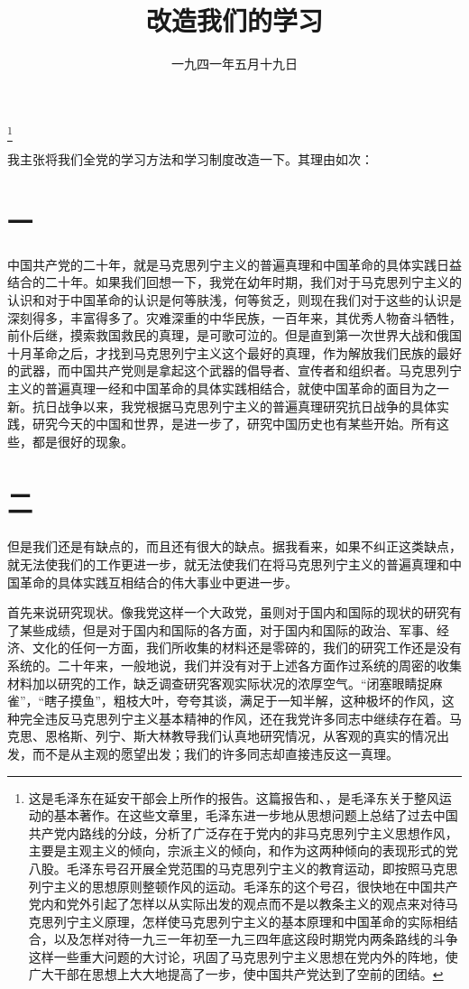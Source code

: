 
\title{改造我们的学习}
\date{一九四一年五月十九日}
\thanks{这是毛泽东在延安干部会上所作的报告。这篇报告和、，是毛泽东关于整风运动的基本著作。在这些文章里，毛泽东进一步地从思想问题上总结了过去中国共产党内路线的分歧，分析了广泛存在于党内的非马克思列宁主义思想作风，主要是主观主义的倾向，宗派主义的倾向，和作为这两种倾向的表现形式的党八股。毛泽东号召开展全党范围的马克思列宁主义的教育运动，即按照马克思列宁主义的思想原则整顿作风的运动。毛泽东的这个号召，很快地在中国共产党内和党外引起了怎样以从实际出发的观点而不是以教条主义的观点来对待马克思列宁主义原理，怎样使马克思列宁主义的基本原理和中国革命的实际相结合，以及怎样对待一九三一年初至一九三四年底这段时期党内两条路线的斗争这样一些重大问题的大讨论，巩固了马克思列宁主义思想在党内外的阵地，使广大干部在思想上大大地提高了一步，使中国共产党达到了空前的团结。}
\maketitle


我主张将我们全党的学习方法和学习制度改造一下。其理由如次：

\section*{一}

中国共产党的二十年，就是马克思列宁主义的普遍真理和中国革命的具体实践日益结合的二十年。如果我们回想一下，我党在幼年时期，我们对于马克思列宁主义的认识和对于中国革命的认识是何等肤浅，何等贫乏，则现在我们对于这些的认识是深刻得多，丰富得多了。灾难深重的中华民族，一百年来，其优秀人物奋斗牺牲，前仆后继，摸索救国救民的真理，是可歌可泣的。但是直到第一次世界大战和俄国十月革命之后，才找到马克思列宁主义这个最好的真理，作为解放我们民族的最好的武器，而中国共产党则是拿起这个武器的倡导者、宣传者和组织者。马克思列宁主义的普遍真理一经和中国革命的具体实践相结合，就使中国革命的面目为之一新。抗日战争以来，我党根据马克思列宁主义的普遍真理研究抗日战争的具体实践，研究今天的中国和世界，是进一步了，研究中国历史也有某些开始。所有这些，都是很好的现象。

\section*{二}

但是我们还是有缺点的，而且还有很大的缺点。据我看来，如果不纠正这类缺点，就无法使我们的工作更进一步，就无法使我们在将马克思列宁主义的普遍真理和中国革命的具体实践互相结合的伟大事业中更进一步。

首先来说研究现状。像我党这样一个大政党，虽则对于国内和国际的现状的研究有了某些成绩，但是对于国内和国际的各方面，对于国内和国际的政治、军事、经济、文化的任何一方面，我们所收集的材料还是零碎的，我们的研究工作还是没有系统的。二十年来，一般地说，我们并没有对于上述各方面作过系统的周密的收集材料加以研究的工作，缺乏调查研究客观实际状况的浓厚空气。“闭塞眼睛捉麻雀”，“瞎子摸鱼”，粗枝大叶，夸夸其谈，满足于一知半解，这种极坏的作风，这种完全违反马克思列宁主义基本精神的作风，还在我党许多同志中继续存在着。马克思、恩格斯、列宁、斯大林教导我们认真地研究情况，从客观的真实的情况出发，而不是从主观的愿望出发；我们的许多同志却直接违反这一真理。

